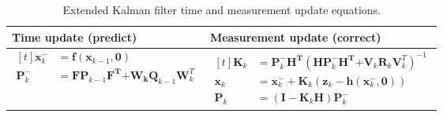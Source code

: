 \documentclass[12pt]{article}
\begin{document}
\begin{table}[h]
	\renewcommand{\arraystretch}{1.5}
	\caption{Extended Kalman filter time and measurement update equations.}
	\centering
	\label{tab:table-EKF}
	\begin{tabular}{C{7cm}|C{7cm}}
		\hline
		Time update (predict) & Measurement update (correct) \\
		\hline
		$\begin{aligned}[t]
			\mathbf{x}_{k}^{-} &= \mathbf{f}( \mathbf{x}_{k - 1}, \mathbf{0}) \\
			\mathbf{P}_{k}^{-} &= \mathbf{F}\mathbf{P}_{k - 1}\mathbf{F}^{\mathbf{T}}\mathbf{+}\mathbf{W}_{\mathbf{k}}\mathbf{Q}_{k-1}\mathbf{W}_{k}^{T}
		\end{aligned}$ &
		$\begin{aligned}[t]
			\mathbf{K}_{k} &= \mathbf{P}_{k}^{-}\mathbf{H}^{\mathbf{T}}( \mathbf{H}\mathbf{P}_{k}^{-}\mathbf{H}^{\mathbf{T}}\mathbf{+}\mathbf{V}_{k}\mathbf{R}_{k}\mathbf{V}_{k}^{T})^{- 1} \\
			\mathbf{x}_{k} &= \mathbf{x}_{k}^{-} + \mathbf{K}_{k}( \mathbf{z}_{k} - \mathbf{h}(\mathbf{x}_{k}^{-},\mathbf{0})) \\
			\mathbf{P}_{k} &= ( \mathbf{I} - \mathbf{K}_{k}\mathbf{H})\mathbf{P}_{k}^{-}
		\end{aligned}$ \\
		\hline
	\end{tabular}
\end{table}
\end{document}

